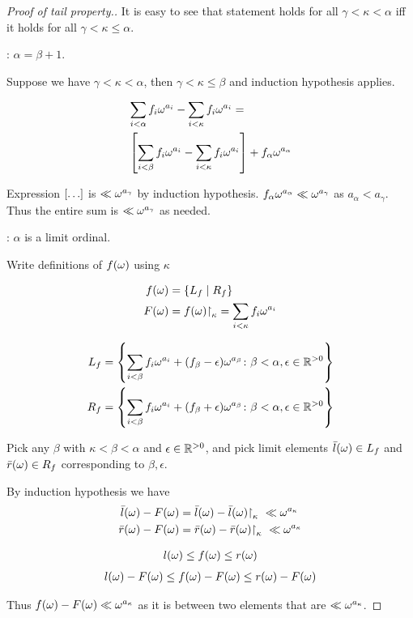 \begin{proof}[Proof of tail property.] %
	It is easy to see that statement holds for all $\gamma < \kappa < \alpha$ iff it holds for all $\gamma < \kappa \leq \alpha$.

	: $\alpha = \beta + 1$.

	Suppose we have $\gamma < \kappa < \alpha$, then $\gamma < \kappa \leq \beta$ and induction hypothesis applies.

	\begin{align*}
		&\sum_{i < \alpha} f_i \omega^{a_i} - \sum_{i < \kappa} f_i \omega^{a_i} = \\
		&\left[ \sum_{i < \beta} f_i \omega^{a_i} - \sum_{i < \kappa} f_i \omega^{a_i} \right] + f_\alpha \omega^{a_\alpha}
	\end{align*}

	Expression $\left[ \ldots \right]$ is $\ll \omega^{a_\gamma}$ by induction hypothesis. $f_\alpha \omega^{a_\alpha} \ll \omega^{a_\gamma}$ as $a_\alpha < a_\gamma$. Thus the entire sum is $\ll \omega^{a_\gamma}$ as needed.

	: $\alpha$ is a limit ordinal.

	Write definitions of $f(\omega)$ using $\kappa$

	\begin{align*}
		f(\omega) &= \left\{ L_f \mid R_f \right\} \\
		F(\omega) &= f(\omega)\mathord{\upharpoonright}_{\kappa} = \sum_{i < \kappa} f_i \omega^{a_i}
	\end{align*}

	\begin{align*}
		L_f &= \left\{ \sum_{i < \beta} f_i \omega^{a_i} + (f_\beta - \epsilon) \omega^{a_\beta}
		\colon \beta < \alpha, \epsilon \in \mathbb{R}^{>0} \right\} \\
		R_f &= \left\{ \sum_{i < \beta} f_i \omega^{a_i} + (f_\beta + \epsilon) \omega^{a_\beta}
		\colon \beta < \alpha, \epsilon \in \mathbb{R}^{>0} \right\} \\
	\end{align*}

	Pick any $\beta$ with $\kappa < \beta < \alpha$ and $\epsilon \in \mathbb{R}^{>0}$,
	and pick limit elements $\bar l(\omega) \in L_f$ and $\bar r(\omega) \in R_f$ corresponding to $\beta, \epsilon$.

	By induction hypothesis we have 
	\begin{align*}
		\bar l(\w) - F(\w) &= \bar l(\w) - \bar l(\w)\midr\kappa \ \ll  \w^{a_\kappa} \\
		\bar r(\w) - F(\w) &= \bar r(\w) - \bar r(\w)\midr\kappa \ \ll  \w^{a_\kappa}
	\end{align*}

	\begin{align*}
		l(\omega) \leq f(\omega) \leq r(\omega) \\
	\end{align*}
	\begin{align*}
		l(\omega) - F(\omega) \leq f(\omega) - F(\omega) \leq r(\omega) - F(\omega)
	\end{align*}
	 
	Thus $f(\omega) - F(\omega) \ll \omega^{a_\kappa}$ as it is between two elements that are $\ll  \omega^{a_\kappa}$.
\end{proof}

